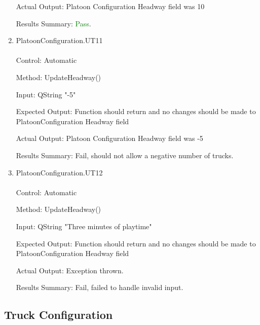 \documentclass[12pt, titlepage]{article}
\begin{document}
\begin{enumerate}
  Actual Output: Platoon Configuration Headway field was 10

  Results Summary: \textcolor{green} {Pass}.
\item{PlatoonConfiguration.UT11}\\\\
  Control: Automatic

  Method: UpdateHeadway()

  Input: QString "-5"

  Expected Output: Function should return and no changes should be made to PlatoonConfiguration Headway field

  Actual Output: Platoon Configuration Headway field was -5

  Results Summary: Fail, should not allow a negative number of trucks.
  \item{PlatoonConfiguration.UT12}\\\\
  Control: Automatic

  Method: UpdateHeadway()

  Input: QString "Three minutes of playtime"

  Expected Output: Function should return and no changes should be made to PlatoonConfiguration Headway field

  Actual Output: Exception thrown.

  Results Summary: Fail, failed to handle invalid input.
\end{enumerate}
\subsection{Truck Configuration}
\end{document}
